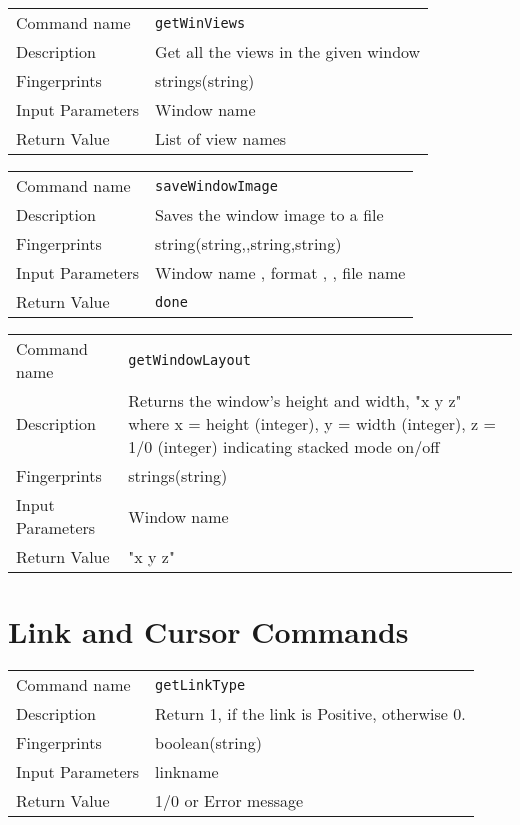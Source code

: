 \noindent
\begin{tabular}{l|p{5in}}
\hline
Command name &{\tt getWinViews }\\ 
Description &
 Get all the views in the given window 
 	\\
Fingerprints & strings(string)\\
Input Parameters& Window name \\
Return Value& List of view names \\
\hline
\end{tabular}
\bigskip

\noindent
\begin{tabular}{l|p{5in}}
\hline
Command name &{\tt saveWindowImage }\\ 
Description &
 Saves the window image to a file 
 	\\
Fingerprints & string(string,,string,string)\\
Input Parameters& Window name , format , , file name \\
Return Value&{\tt done}\\
\hline
\end{tabular}
\bigskip

\noindent
\begin{tabular}{l|p{5in}}
\hline
Command name &{\tt getWindowLayout }\\ 
Description &
 Returns the window's height and width, "x y z" where x = height (integer),  y = width (integer), z = 1/0 (integer) indicating stacked mode on/off 
 	\\
Fingerprints & strings(string)\\
Input Parameters& Window name \\
Return Value& "x y z"\\
\hline
\end{tabular}
\bigskip


\section{Link and Cursor Commands}
\noindent
\begin{tabular}{l|p{5in}}
\hline
Command name &{\tt getLinkType }\\ 
Description &
Return 1, if the link is Positive, otherwise 0. 
 	\\
Fingerprints & boolean(string)\\
Input Parameters&linkname\\
Return Value&1/0 or Error message\\
\hline
\end{tabular}
\bigskip

